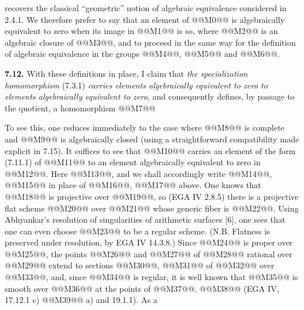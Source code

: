 
recovers the classical ``geometric'' notion of algebraic equivalence considered in 2.4.1. We therefore prefer to say that an element of @@M0@@ is algebraically equivalent to zero when its image in @@M1@@ is so, where @@M2@@ is an algebraic closure of @@M3@@, and to proceed in the same way for the definition of algebraic equivalence in the groups @@M4@@, @@M5@@ and @@M6@@.

\textbf{7.12.} With these definitions in place, I claim that \emph{the specialization homomorphism} (7.3.1) \emph{carries elements algebraically equivalent to zero to elements algebraically equivalent to zero}, and consequently defines, by passage to the quotient, a homomorphism
@@M7@@

To see this, one reduces immediately to the case where @@M8@@ is complete and @@M9@@ is algebraically closed (using a straightforward compatibility made explicit in 7.15). It suffices to see that @@M10@@ carries an element of the form (7.11.1) of @@M11@@ to an element algebraically equivalent to zero in @@M12@@. Here @@M13@@, and we shall accordingly write @@M14@@, @@M15@@ in place of @@M16@@, @@M17@@ above. One knows that @@M18@@ is projective over @@M19@@, so (EGA IV 2.8.5) there is a projective flat scheme @@M20@@ over @@M21@@ whose generic fiber is @@M22@@. Using Abhyankar's resolution of singularities of arithmetic surfaces [6], one sees that one can even choose @@M23@@ to be a regular scheme. (N.B. Flatness is preserved under resolution, by EGA IV 14.3.8.) Since @@M24@@ is proper over @@M25@@, the points @@M26@@ and @@M27@@ of @@M28@@ rational over @@M29@@ extend to sections @@M30@@, @@M31@@ of @@M32@@ over @@M33@@, and, since @@M34@@ is regular, it is well known that @@M35@@ is smooth over @@M36@@ at the points of @@M37@@, @@M38@@ (EGA IV, 17.12.1 c) @@M39@@ a) and 19.1.1). As a 